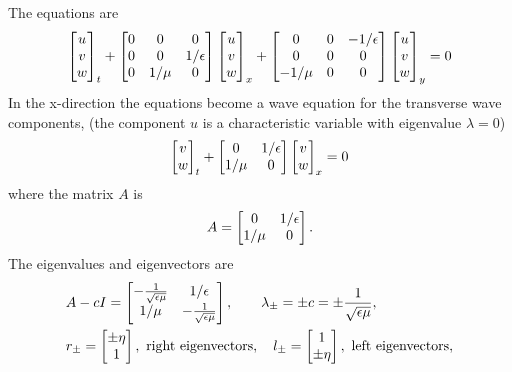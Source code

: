The equations are
\begin{align*}
\begin{bmatrix} u \\ v \\ w \end{bmatrix}_t 
 + 
\begin{bmatrix} 0 & 0 & 0 \\
                0 & 0 & 1/\epsilon \\
                0 & 1/\mu & 0 
\end{bmatrix}
\begin{bmatrix} u \\ v \\ w \end{bmatrix}_x
+ 
\begin{bmatrix} 0 & 0 & -1/\epsilon \\
                0 & 0 &  0 \\
                -1/\mu & 0 & 0 
\end{bmatrix}
\begin{bmatrix} u \\ v \\ w \end{bmatrix}_y
= 0
\end{align*}
In the x-direction the equations become a wave equation for the transverse wave components, 
(the component $u$ is a characteristic variable with eigenvalue $\lambda=0$)
\begin{align*}
\begin{bmatrix} v \\ w \end{bmatrix}_t 
 + 
\begin{bmatrix} 
                 0 & 1/\epsilon \\
                 1/\mu & 0 
\end{bmatrix}
\begin{bmatrix} v \\ w \end{bmatrix}_x
= 0 
\end{align*}
where  the matrix $A$ is 
\begin{align*}
A = \begin{bmatrix} 
                 0 & 1/\epsilon \\
                 1/\mu & 0 
\end{bmatrix} .
\end{align*}
The eigenvalues and eigenvectors are 
\begin{align*}
&  
A - c I = \begin{bmatrix} 
                 -\frac{1}{\sqrt{\epsilon\mu}} & 1/\epsilon \\
                 1/\mu & -\frac{1}{\sqrt{\epsilon\mu}} \end{bmatrix}, \qquad 
\lambda_{\pm} = \pm c = \pm \frac{1}{\sqrt{\epsilon\mu}} , \\
&
   r_{\pm} = \begin{bmatrix} \pm\eta \\ 1\end{bmatrix}, ~\text{right eigenvectors}, \quad
   l_{\pm} = \begin{bmatrix} 1 \\ \pm\eta\end{bmatrix}, ~\text{left eigenvectors},
\end{align*}

